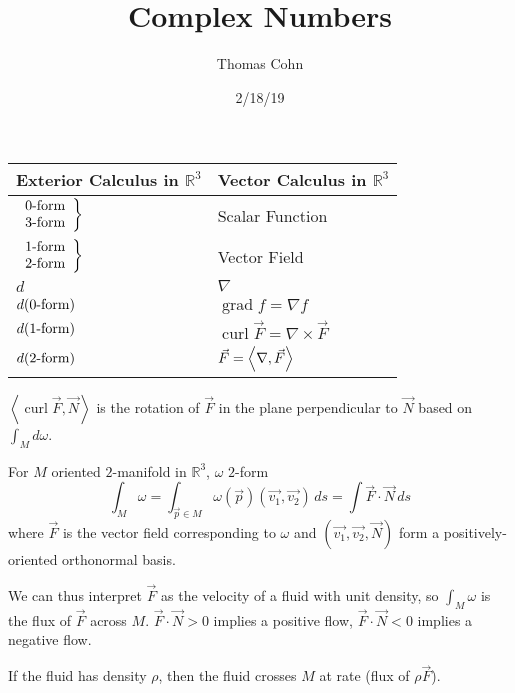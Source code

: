 \documentclass[10pt,letterpaper]{article}
\author{Thomas Cohn}
\title{Complex Numbers}
\date{2/18/19} %
\newcommand{\n}{\hfill\break}
\newcommand{\ptxt}[1]{\textrm{\textnormal{#1}}}
\newcommand{\reals}{\mathbb{R}}
\newcommand{\R}{\reals}
\newcommand{\iprod}[1]{\left<#1\right>}
\newcommand{\del}{\nabla}
\DeclareMathOperator{\grad}{grad}
\DeclareMathOperator{\curl}{curl}
\let\div\relax
\DeclareMathOperator{\div}{div}
\begin{document}
\maketitle
\setlength\RaggedRightParindent{\parindent}
\RaggedRight

\begin{center}
\begin{tabular}{l|l}
	Exterior Calculus in $\R^{3}$ & Vector Calculus in $\R^{3}$\\ \hline
	$\left.\begin{array}{r}0\ptxt{-form}\\ 3\ptxt{-form}\end{array}\right\}$ & Scalar Function\\
	$\left.\begin{array}{r}1\ptxt{-form}\\ 2\ptxt{-form}\end{array}\right\}$ & Vector Field\\
	$d$ & $\del$\\
	$d(0\ptxt{-form})$ & $\grad{}f=\del{}f$\\
	$d(1\ptxt{-form})$ & $\curl\vec{F}=\del\times\vec{F}$\\
	$d(2\ptxt{-form})$ & $\div\vec{F}=\iprod{\del,\vec{F}}$
\end{tabular}
\end{center}

\par\noindent $\iprod{\curl\vec{F},\vec{N}}$ is the rotation of $\vec{F}$ in the plane perpendicular to $\vec{N}$ based on $\int_{M}d\omega$.\n

\par\noindent For $M$ oriented $2$-manifold in $\R^{3}$, $\omega$ $2$-form
\[
\int_{M}\omega=\int_{\vec{p}\in{}M}\omega(\vec{p})(\vec{v_{1}},\vec{v_{2}})\,ds=\int\vec{F}\cdot\vec{N}\,ds
\]
where $\vec{F}$ is the vector field corresponding to $\omega$ and $(\vec{v_{1}},\vec{v_{2}},\vec{N})$ form a positively-oriented orthonormal basis.\n

\par\noindent We can thus interpret $\vec{F}$ as the velocity of a fluid with unit density, so $\int_{M}\omega$ is the flux of $\vec{F}$ across $M$. $\vec{F}\cdot\vec{N}>0$ implies a positive flow, $\vec{F}\cdot\vec{N}<0$ implies a negative flow.\n

\par\noindent If the fluid has density $\rho$, then the fluid crosses $M$ at rate (flux of $\rho\vec{F}$).\n
\end{document}
